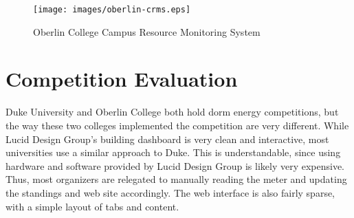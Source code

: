 \begin{figure}
	\centering
	\texttt{[image: images/oberlin-crms.eps]}
	\caption{Oberlin College Campus Resource Monitoring System}
\end{figure}

\section{Competition Evaluation}
\label{competition-evaluation}

% 
% 
% 

Duke University and Oberlin College both hold dorm energy competitions, but the way these two colleges implemented the competition are very different.  While Lucid Design Group's building dashboard is very clean and interactive, most universities use a similar approach to Duke.  This is understandable, since using hardware and software provided by Lucid Design Group is likely very expensive.  Thus, most organizers are relegated to manually reading the meter and updating the standings and web site accordingly.  The web interface is also fairly sparse, with a simple layout of tabs and content.

